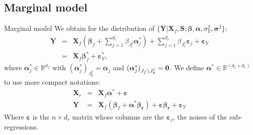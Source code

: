 \documentclass[11pt]{beamer}
\begin{document}
	\subsection{Marginal model}
		\begin{frame}{Marginal model}
		 We obtain  for the distribution of $\{\boldsymbol{Y} |\boldsymbol{X}_f,\boldsymbol{S};\boldsymbol{\beta},\boldsymbol{\alpha},\sigma_Y^2,\boldsymbol{\sigma}^2\}$:
\begin{eqnarray}
	\boldsymbol{Y}%
	&=&\boldsymbol{X}_f (\boldsymbol{\beta}_f+ \sum_{j =1}^{d_r}\beta_{J_r^j}\boldsymbol{\alpha}_j^*)+  \sum_{j =1}^{d_r}\beta_{J_r^j}\boldsymbol{\varepsilon}_j+\boldsymbol{\varepsilon}_Y \label{eq:Trueexpl} \\
	&=&\boldsymbol{X}_f\boldsymbol{\beta}_f^*+\boldsymbol{\varepsilon}_Y^*,\label{eq:modexpl}
\end{eqnarray}
where $\boldsymbol{\alpha}^*_j \in \mathbb{R}^{d_f}$ with $(\boldsymbol{\alpha}_j^*)_{J_p^j}=\boldsymbol{\alpha}_j $ and $(\boldsymbol{\alpha}_j^*)_{J_f\setminus J_p^j}=\bf 0 $. We define $\boldsymbol{\alpha}^* \in \mathbb{R}^{(d_f \times d_r)}$ to use more compact notations:
\begin{eqnarray}
	\boldsymbol{X}_r %
	&=&\boldsymbol{X}_f\boldsymbol{\alpha}^*+\boldsymbol{\varepsilon} \nonumber \\
	\boldsymbol{Y}%
	&=&\boldsymbol{X}_f (\boldsymbol{\beta}_f+ \boldsymbol{\alpha}^*\boldsymbol{\beta_{r}})+ \boldsymbol{\varepsilon}\boldsymbol{\beta_{r}}+\boldsymbol{\varepsilon}_Y \label{eq:Trueexpl2}
\end{eqnarray} 
Where $\boldsymbol{\varepsilon}$ is the $n\times d_r$ matrix whose columns are the $\boldsymbol{\varepsilon}_j$, the noises of the sub-regressions.
		\end{frame}
\end{document}
